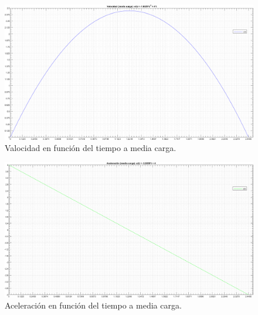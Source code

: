\clearpage

\begin{figure}[!h] %
\begin{center}
\includegraphics[width=1.2 \textwidth, keepaspectratio=true, angle=90]{img/grafico_funcion_v.png} %
\caption{\label{fig:fig_position_n_2} \footnotesize{Valocidad en función del tiempo a media carga.}}
\end{center}
\end{figure}

\clearpage

\begin{figure}[!h] %
\begin{center}
\includegraphics[width=1.2 \textwidth, keepaspectratio=true, angle=90]{img/grafico_funcion_a.png} %
\caption{\label{fig:fig_position_n_2} \footnotesize{Aceleración en función del tiempo a media carga.}}
\end{center}
\end{figure}

\clearpage

